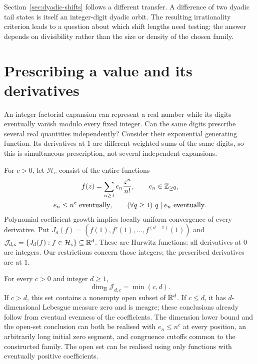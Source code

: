 \documentclass[11pt]{article}
\begin{document}
Section~\ref{sec:dyadic-shifts} follows a different transfer. A difference of
two dyadic tail states is itself an integer-digit dyadic orbit. The resulting
irrationality criterion leads to a question about which shift lengths need
testing; the answer depends on divisibility rather than the size or density
of the chosen family.

\section{Prescribing a value and its derivatives}\label{capacity:sec:jets-intro}
An integer factorial expansion can represent a real number while its digits
eventually vanish modulo every fixed integer. Can the same digits prescribe
several real quantities independently? Consider their exponential generating
function. Its derivatives at $1$ are different weighted sums of the same
digits, so this is simultaneous prescription, not several independent expansions.

For $c>0$, let $\mathcal H_c$ consist of the entire functions
\[
 \begin{gathered}
 f(z)=\sum_{n\ge1}e_n\frac{z^n}{n!},\qquad e_n\in\mathbb{Z}_{\ge0},\\
 e_n\le n^c\ \hbox{eventually},\qquad
 (\forall q\ge1)\ q\mid e_n\ \hbox{eventually}.
 \end{gathered}
\]
Polynomial coefficient growth implies locally uniform convergence of every
derivative. Put $J_d(f)=(f(1),f'(1),\ldots,f^{(d-1)}(1))$ and
$\mathcal J_{d,c}=\{J_d(f):f\in\mathcal H_c\}\subseteq\mathbb{R}^d$.
These are Hurwitz functions: all derivatives at $0$ are integers. Our
restrictions concern those integers; the prescribed derivatives are at $1$.

\begin{theorem}
\label{capacity:thm:jets}
For every $c>0$ and integer $d\ge1$,
\[
 \dim_{\mathrm H}\mathcal J_{d,c}=\min(c,d).
\]
If $c>d$, this set contains a nonempty open subset of $\mathbb{R}^d$.
If $c\le d$, it has $d$-dimensional Lebesgue measure zero and is meagre;
these conclusions already follow from eventual evenness of the coefficients.
The dimension lower bound and the open-set conclusion can both be realised
with $e_n\le n^c$ at every position, an arbitrarily long initial zero segment,
and congruence cutoffs common to the constructed family. The open set can
be realised using only functions with eventually positive coefficients.
\end{theorem}
\end{document}
